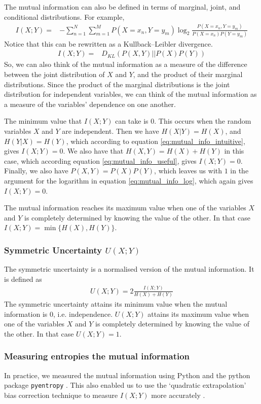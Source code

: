 \documentclass[a4paper,12pt]{article}
\theoremstyle{definition}
\begin{document}
The mutual information can also be defined in terms of marginal, joint, and conditional distributions. For example,
\begin{align}\label{eq:mutual_info_log}
I(X;Y)  =& -\sum_{n=1}^N \sum_{m=1}^M P(X=x_n, Y=y_m) \log _2 \frac{P(X=x_n, Y=y_m)}{P(X=x_n) P(Y=y_m)}
\end{align}
Notice that this can be rewritten as a Kullback–Leibler divergence.
\begin{align}
I(X;Y)  =& D_{KL}(P(X,Y)|| P(X)P(Y))
\end{align}
So, we can also think of the mutual information as a measure of the difference between the joint distribution of $X$ and $Y$, and the product of their marginal distributions. Since the product of the marginal distributions is the joint distribution for independent variables, we can think of the mutual information as a measure of the variables' dependence on one another.

The minimum value that $I(X;Y)$ can take is $0$. This occurs when the random variables $X$ and $Y$ are independent. Then we have $H(X|Y) = H(X)$, and $H(Y|X) = H(Y)$, which according to equation \ref{eq:mutual_info_intuitive}, gives $I(X;Y) = 0$. We also have that $H(X,Y) = H(X) + H(Y)$ in this case, which according equation \ref{eq:mutual_info_useful}, gives $I(X;Y) = 0$. Finally, we also have $P(X,Y) = P(X)P(Y)$, which leaves us with $1$ in the argument for the logarithm in equation \ref{eq:mutual_info_log}, which again gives $I(X;Y) = 0$.

The mutual information reaches its maximum value when one of the variables $X$ and $Y$ is completely determined by knowing the value of the other. In that case $I(X;Y) = \min \lbrace H(X), H(Y) \rbrace$.

\subsubsection{Symmetric Uncertainty $U(X;Y)$}
The symmetric uncertainty is a normalised version of the mutual information. It is defined as
\begin{align}\label{eq:symmetric_uncertainty}
  U(X;Y) = 2 \frac{I(X;Y)}{H(X) + H(Y)}
\end{align}
The symmetric uncertainty attains its minimum value when the mutual information is $0$, i.e. independence. $U(X;Y)$ attains its maximum value when one of the variables $X$ and $Y$ is completely determined by knowing the value of the other. In that case $U(X;Y) = 1$.

\subsubsection{Measuring entropies the mutual information}
In practice, we measured the mutual information using Python and the python package \texttt{pyentropy} \cite{ince}. This also enabled us to use the `quadratic extrapolation' bias correction technique to measure $I(X;Y)$ more accurately \cite{strong, treves}.
\end{document}
